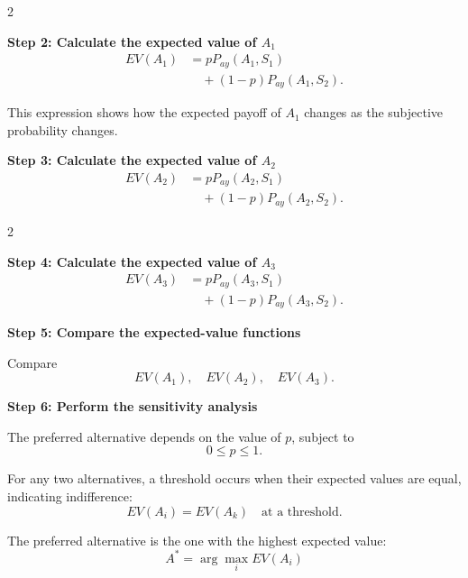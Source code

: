 	\begin{multicols}{2}
		\vspace{0pt}
		
		\textbf{Step 2: Calculate the expected value of $A_1$}
		\[
		\begin{aligned}
			EV(A_1)
			&=pP_{ay}(A_1,S_1)\\
			&\quad +(1-p)P_{ay}(A_1,S_2).
		\end{aligned}
		\]
		
		This expression shows how the expected payoff of $A_1$ changes
		as the subjective probability changes.
		
		\columnbreak
		
		\textbf{Step 3: Calculate the expected value of $A_2$}
		\[
		\begin{aligned}
			EV(A_2)
			&=pP_{ay}(A_2,S_1)\\
			&\quad +(1-p)P_{ay}(A_2,S_2).
		\end{aligned}
		\]
		
	\end{multicols}
	
	\begin{multicols}{2}
		\vspace{0pt}
		
		\textbf{Step 4: Calculate the expected value of $A_3$}
		\[
		\begin{aligned}
			EV(A_3)
			&=pP_{ay}(A_3,S_1)\\
			&\quad +(1-p)P_{ay}(A_3,S_2).
		\end{aligned}
		\]
		
		\columnbreak
		
		\textbf{Step 5: Compare the expected-value functions}
		
		Compare
		$$
		EV(A_1),\quad
		EV(A_2),\quad
		EV(A_3).
		$$
		
	\end{multicols}
	
	\textbf{Step 6: Perform the sensitivity analysis}
	
	The preferred alternative depends on the value of $p$, subject to
	$$
	0\leq p\leq1.
	$$
	
	For any two alternatives, a threshold occurs when their expected values
	are equal, indicating indifference:
	$$
	EV(A_i)=EV(A_k)
	\quad\text{at a threshold}.
	$$
	
	The preferred alternative is the one with the highest expected value:
	$$
	A^*=\arg\max_i EV(A_i)
	$$ \vspace{-10mm}
	
